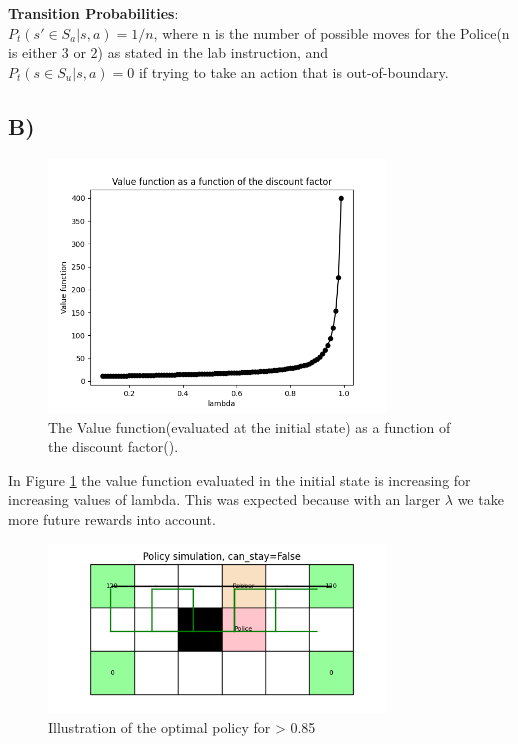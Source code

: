 \documentclass{article}
\begin{document}
\textbf{Transition Probabilities}:\\
$P_t(s' \in S_a |s,a) = 1/n$, where n is the number of possible moves for the Police(n is either $3$ or $2$) as stated in the lab instruction, and \\$P_t(s \in S_u |s,a) = 0$ if trying to take an action that is out-of-boundary. 

        


\subsection*{B)}

\begin{figure}[H]
    \centering
    \includegraphics[width=0.8\textwidth]{Lab_1/images/problem_2/valueFunction.png}
    \caption{\small The Value function(evaluated at the initial state) as a function of the discount factor(\lambda). }
    \label{fig:Valfunc}
\end{figure}




\noindent 
In Figure \ref{fig:Valfunc} the value function evaluated in the initial state is increasing for increasing values of lambda. This was expected because with an larger $\lambda$ we take more future rewards into account.   




\begin{figure}[H]
    \centering
    \includegraphics[width=0.8\textwidth]{Lab_1/images/problem_2/cityRun_ValIter_Nov-25-2020_11-55-18.png}
    \caption{\small Illustration of the optimal policy for \lambda > 0.85  }
    \label{fig:optpol1}
\end{figure}
\end{document}
